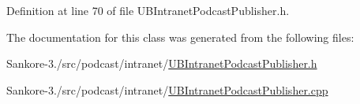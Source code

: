 Definition at line 70 of file U\-B\-Intranet\-Podcast\-Publisher.\-h.



The documentation for this class was generated from the following files\-:\begin{DoxyCompactItemize}
\item 
Sankore-\/3./src/podcast/intranet/\hyperlink{_u_b_intranet_podcast_publisher_8h}{U\-B\-Intranet\-Podcast\-Publisher.\-h}\item 
Sankore-\/3./src/podcast/intranet/\hyperlink{_u_b_intranet_podcast_publisher_8cpp}{U\-B\-Intranet\-Podcast\-Publisher.\-cpp}\end{DoxyCompactItemize}
